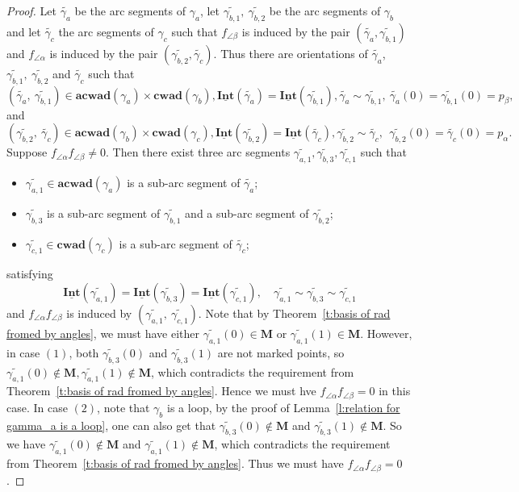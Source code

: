 \documentclass[a4paper,10pt]{amsart}
\theoremstyle{plain}          %
\theoremstyle{definition}
\def\MM{\mathbf{M}}
\def\MM{\mathbf{M}}
\newcommand{\Intv}{\underline{\mathbf{Int}}}
\newcommand{\aad}{\mathbf{acwad}}
\newcommand{\cad}{\mathbf{cwad}}
\begin{document}
\begin{proof}
     Let
$\widetilde{\gamma_{a}}$ be the arc segments of $\gamma_a$, let $\widetilde{\gamma_{b,1}},~\widetilde{\gamma_{b,2}}$ be the arc segments of $\gamma_b$ and let $\widetilde{\gamma_{c}}$ the arc segments of $\gamma_c$ such that  $f_{\angle\beta}$ is induced by the pair $(\widetilde{\gamma_{a}},\widetilde{\gamma_{b,1}})$ and
 $f_{\angle\alpha}$ is induced by the pair $(\widetilde{\gamma_{b,2}},\widetilde{\gamma_{c}})$. Thus there are orientations of $\widetilde{\gamma_{a}}$, $\widetilde{\gamma_{b,1}},~\widetilde{\gamma_{b,2}}$ and $\widetilde{\gamma_{c}}$  such that
 \[(\widetilde{\gamma_{a}},~\widetilde{\gamma_{b,1}})\in\aad(\gamma_a)\times\cad(\gamma_b), \Intv(\widetilde{\gamma_{a}})=\Intv(\widetilde{\gamma_{b,1}}), \widetilde{\gamma_{a}}\sim\widetilde{\gamma_{b,1}},~\widetilde{\gamma_{a}}(0)=\widetilde{\gamma_{b,1}}(0)=p_{\beta},\]and
 \[(\widetilde{\gamma_{b,2}},~\widetilde{\gamma_{c}})\in\aad(\gamma_b)\times\cad(\gamma_c),\Intv(\widetilde{\gamma_{b,2}})=\Intv(\widetilde{\gamma_{c}}), \widetilde{\gamma_{b,2}}\sim\widetilde{\gamma_{c}},~~\widetilde{\gamma_{b,2}}(0)=\widetilde{\gamma_{c}}(0)=p_{\alpha}.\]
Suppose $f_{\angle\alpha} f_{\angle\beta}\neq 0$. Then there exist three arc segments 
 $\widetilde{\gamma_{a,1}},\widetilde{\gamma_{b,3}}, \widetilde{\gamma_{c,1}}$ such that 
 \begin{itemize}
     \item $\widetilde{\gamma_{a,1}}\in\aad(\gamma_{a})$ is a sub-arc segment of $\widetilde{\gamma_{a}}$;
     \item  $\widetilde{\gamma_{b,3}}$ is a sub-arc segment of $\widetilde{\gamma_{b,1}}$ and a sub-arc segment of $\widetilde{\gamma_{b,2}}$;
     \item  $\widetilde{\gamma_{c,1}}\in\cad(\gamma_{c})$ is a sub-arc segment of $\widetilde{\gamma_{c}}$;
 \end{itemize}
   satisfying $$ \Intv(\widetilde{\gamma_{a,1}})=\Intv(\widetilde{\gamma_{b,3}})=\Intv(\widetilde{\gamma_{c,1}}), \quad \widetilde{\gamma_{a,1}}\sim\widetilde{\gamma_{b,3}}\sim\widetilde{\gamma_{c,1}}$$
 and $f_{\angle\alpha} f_{\angle\beta}$ is induced by $(\widetilde{\gamma_{a,1}},~\widetilde{\gamma_{c,1}}).$
Note that by Theorem~\ref{t:basis of rad fromed by angles}, we must have either $\widetilde{\gamma_{a,1}}(0)\in\MM$ or   $\widetilde{\gamma_{a,1}}(1)\in\MM$.
However, 
in case $(1)$, both $\widetilde{\gamma_{b,3}}(0)$ and $\widetilde{\gamma_{b,3}}(1)$ are not marked points, so
 $\widetilde{\gamma_{a,1}}(0)\notin\MM,  \widetilde{\gamma_{a,1}}(1)\notin\MM$,  which contradicts the requirement from Theorem~\ref{t:basis of rad fromed by angles}. Hence we must hve  $f_{\angle\alpha} f_{\angle\beta}=0$ in this case.
In case $(2)$, note that $\gamma_b$ is a loop,  by the proof of  Lemma~\ref{l:relation for gamma_a is a loop},
one can also get that   $\widetilde{\gamma_{b,3}}(0)\notin \MM$ and $\widetilde{\gamma_{b,3}}(1)\notin\MM$. So we have $\widetilde{\gamma_{a,1}}(0)\notin \MM$ and $\widetilde{\gamma_{a,1}}(1)\notin \MM$,  which contradicts the requirement from Theorem~\ref{t:basis of rad fromed by angles}. Thus we must have $f_{\angle\alpha} f_{\angle\beta}=0$.
\end{proof}
\end{document}
